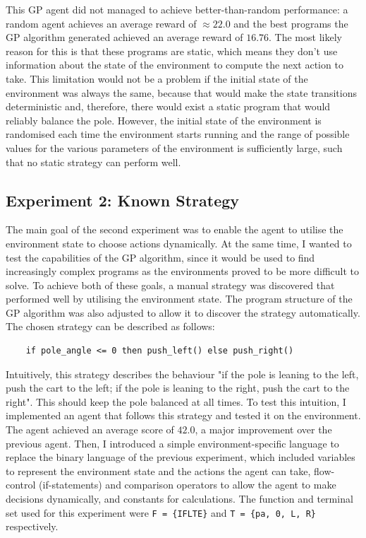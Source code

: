 This GP agent did not managed to achieve better-than-random performance: a random agent achieves an average reward of $\approx22.0$ and the best programs the GP algorithm generated achieved an average reward of $16.76$. The most likely reason for this is that these programs are static, which means they don’t use information about the state of the environment to compute the next action to take. This limitation would not be a problem if the initial state of the environment was always the same, because that would make the state transitions deterministic and, therefore, there would exist a static program that would reliably balance the pole. However, the initial state of the environment is randomised each time the environment starts running and the range of possible values for the various parameters of the environment is sufficiently large, such that no static strategy can perform well.

\subsection{Experiment 2: Known Strategy}
The main goal of the second experiment was to enable the agent to utilise the environment state to choose actions dynamically. At the same time, I wanted to test the capabilities of the GP algorithm, since it would be used to find increasingly complex programs as the environments proved to be more difficult to solve. To achieve both of these goals, a manual strategy was discovered that performed well by utilising the environment state. The program structure of the GP algorithm was also adjusted to allow it to discover the strategy automatically. The chosen strategy can be described as follows:

\begin{verbatim}
    if pole_angle <= 0 then push_left() else push_right()
\end{verbatim}

Intuitively, this strategy describes the behaviour "if the pole is leaning to the left, push the cart to the left; if the pole is leaning to the right, push the cart to the right". This should keep the pole balanced at all times. To test this intuition, I implemented an agent that follows this strategy and tested it on the environment. The agent achieved an average score of $42.0$, a major improvement over the previous agent. Then, I introduced a simple environment-specific language to replace the binary language of the previous experiment, which included variables to represent the environment state and the actions the agent can take, flow-control (if-statements) and comparison operators to allow the agent to make decisions dynamically, and constants for calculations. The function and terminal set used for this experiment were \verb+F = {IFLTE}+ and \verb+T = {pa, 0, L, R}+ respectively.

